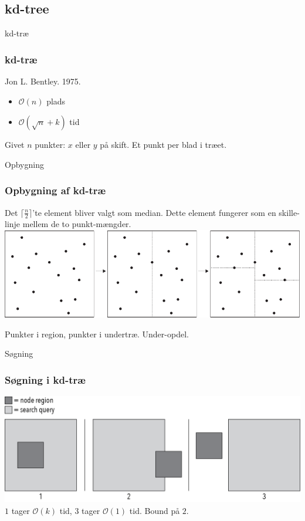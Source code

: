 \documentclass[pdf]{beamer}
\begin{document}
\subsection{kd-tree}

\begin{frame}{kd-træ}
  \frametitle{kd-træ}
  Jon L. Bentley. 1975.
  \begin{itemize}
    \item $\mathcal{O}(n)$ plads
    \item $\mathcal{O}(\sqrt{n} + k)$ tid
  \end{itemize}

  Givet $n$ punkter: $x$ eller $y$ på skift. Et punkt per blad i træet.
\end{frame}

\begin{frame}{Opbygning}
  \frametitle{Opbygning af kd-træ}
  Det $\lceil \frac{n}{2} \rceil$'te element bliver valgt som median. Dette element fungerer som en skille-linje mellem de to punkt-mængder. 
  \includegraphics[scale=0.75]{pictures/kd_subdivision-eps-converted-to.pdf}

    Punkter i region, punkter i undertræ. Under-opdel.
\end{frame}


\begin{frame}{Søgning}
  \frametitle{Søgning i kd-træ}
  \begin{center}
    \includegraphics[scale=0.75]{pictures/search_query_overlap.png} \\

    $1$ tager $\mathcal{O}(k)$ tid, $3$ tager $\mathcal{O}(1)$ tid. Bound på $2$.\\


  \end{center}

\end{frame}
\end{document}
